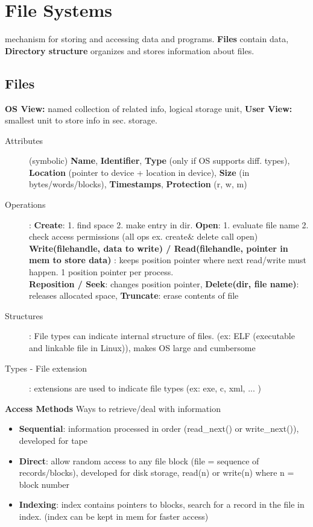 \section*{File Systems}
mechanism for storing and accessing data and programs. \textbf{Files} contain data, \textbf{Directory structure} organizes and stores information about files.

\subsection*{Files}
\textbf{OS View:}  named collection of related info, logical storage unit, \textbf{User View:}  smallest unit to store info in sec. storage.
\begin{description}
    \item[Attributes](symbolic) \textbf{Name}, \textbf{Identifier},  \textbf{Type} (only if OS supports diff. types), \textbf{Location} (pointer to device + location in device), \textbf{Size} (in bytes/words/blocks), \textbf{Timestamps}, \textbf{Protection} (r, w, m)
    \item[Operations]: \textbf{Create}: 1. find space 2. make entry in dir. \textbf{Open}: 1. evaluate file name 2. check access permissions (all ops ex. create\& delete call open) \textbf{Write(filehandle, data to write) / Read(filehandle, pointer in mem to store data) }: keeps position pointer where next read/write must happen. 1 position pointer per process. \\
    \textbf{Reposition / Seek}: changes position pointer, \textbf{Delete(dir, file name)}: releases allocated space, \textbf{Truncate}: erase contents of file
    \item[Structures]: File types can indicate internal structure of files. (ex: ELF (executable and linkable file in Linux)), makes OS large and cumbersome
    \item[Types - File extension]: extensions are used to indicate file types (ex: exe, c, xml, ... )
\end{description}

\textbf{Access Methods} Ways to retrieve/deal with information
\begin{itemize}
    \item \textbf{Sequential}: information processed in order (read\_next() or write\_next()), developed for tape
    \item \textbf{Direct}: allow random access to any file block (file = sequence of records/blocks), developed for disk storage, read(n) or write(n) where n = block number
    \item \textbf{Indexing}: index contains pointers to blocks, search for a record in the file in index. (index can be kept in mem for faster access)
\end{itemize}

